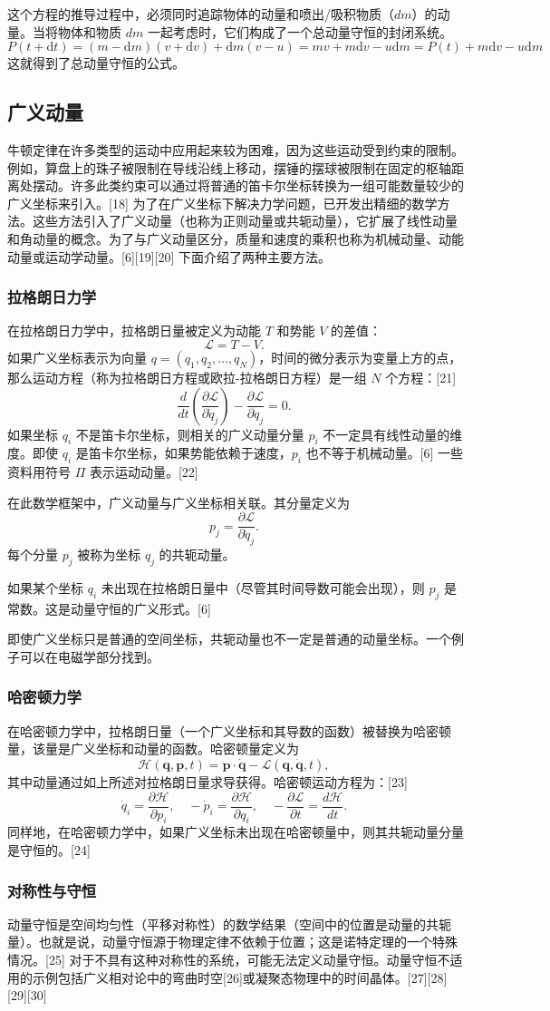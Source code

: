 这个方程的推导过程中，必须同时追踪物体的动量和喷出/吸积物质（\( dm \)）的动量。当将物体和物质 \( dm \) 一起考虑时，它们构成了一个总动量守恒的封闭系统。
\[
P(t + \text{d}t) = (m - \text{d}m)(v + \text{d}v) + \text{d}m(v - u) = mv + m\text{d}v - u\text{d}m = P(t) + m\text{d}v - u\text{d}m~
\]
这就得到了总动量守恒的公式。
\subsection{广义动量}
牛顿定律在许多类型的运动中应用起来较为困难，因为这些运动受到约束的限制。例如，算盘上的珠子被限制在导线沿线上移动，摆锤的摆球被限制在固定的枢轴距离处摆动。许多此类约束可以通过将普通的笛卡尔坐标转换为一组可能数量较少的广义坐标来引入。[18] 为了在广义坐标下解决力学问题，已开发出精细的数学方法。这些方法引入了广义动量（也称为正则动量或共轭动量），它扩展了线性动量和角动量的概念。为了与广义动量区分，质量和速度的乘积也称为机械动量、动能动量或运动学动量。[6][19][20] 下面介绍了两种主要方法。
\subsubsection{拉格朗日力学}
在拉格朗日力学中，拉格朗日量被定义为动能 \( T \) 和势能 \( V \) 的差值：
\[
\mathcal{L} = T - V.~
\]
如果广义坐标表示为向量 \( q = (q_1, q_2, \ldots, q_N) \)，时间的微分表示为变量上方的点，那么运动方程（称为拉格朗日方程或欧拉-拉格朗日方程）是一组 \( N \) 个方程：[21]
\[
\frac{d}{dt}\left(\frac{\partial \mathcal{L}}{\partial \dot{q}_j}\right) - \frac{\partial \mathcal{L}}{\partial q_j} = 0.~
\]
如果坐标 \( q_i \) 不是笛卡尔坐标，则相关的广义动量分量 \( p_i \) 不一定具有线性动量的维度。即使 \( q_i \) 是笛卡尔坐标，如果势能依赖于速度，\( p_i \) 也不等于机械动量。[6] 一些资料用符号 \( \Pi \) 表示运动动量。[22]

在此数学框架中，广义动量与广义坐标相关联。其分量定义为
\[
p_j = \frac{\partial \mathcal{L}}{\partial \dot{q}_j}.~
\]
每个分量 \( p_j \) 被称为坐标 \( q_j \) 的共轭动量。

如果某个坐标 \( q_i \) 未出现在拉格朗日量中（尽管其时间导数可能会出现），则 \( p_j \) 是常数。这是动量守恒的广义形式。[6]

即使广义坐标只是普通的空间坐标，共轭动量也不一定是普通的动量坐标。一个例子可以在电磁学部分找到。
\subsubsection{哈密顿力学}
在哈密顿力学中，拉格朗日量（一个广义坐标和其导数的函数）被替换为哈密顿量，该量是广义坐标和动量的函数。哈密顿量定义为
\[
\mathcal{H}(\mathbf{q}, \mathbf{p}, t) = \mathbf{p} \cdot \dot{\mathbf{q}} - \mathcal{L}(\mathbf{q}, \dot{\mathbf{q}}, t),~
\]
其中动量通过如上所述对拉格朗日量求导获得。哈密顿运动方程为：[23]
\[
\dot{q}_i = \frac{\partial \mathcal{H}}{\partial p_i}, \quad -\dot{p}_i = \frac{\partial \mathcal{H}}{\partial q_i}, \quad -\frac{\partial \mathcal{L}}{\partial t} = \frac{d\mathcal{H}}{dt}.~
\]
同样地，在哈密顿力学中，如果广义坐标未出现在哈密顿量中，则其共轭动量分量是守恒的。[24]
\subsubsection{对称性与守恒}
动量守恒是空间均匀性（平移对称性）的数学结果（空间中的位置是动量的共轭量）。也就是说，动量守恒源于物理定律不依赖于位置；这是诺特定理的一个特殊情况。[25] 对于不具有这种对称性的系统，可能无法定义动量守恒。动量守恒不适用的示例包括广义相对论中的弯曲时空[26]或凝聚态物理中的时间晶体。[27][28][29][30]